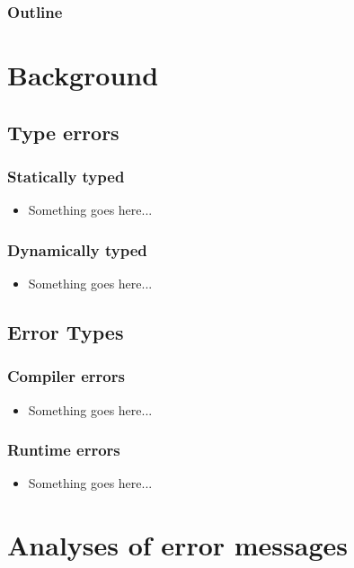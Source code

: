 \documentclass{beamer}
\begin{document}
\begin{frame}
  \frametitle{Outline}
  \tableofcontents[hideallsubsections]
\end{frame}

\section[Background]{Background}

\subsection{Type errors}

\begin{frame}
  \frametitle{Statically typed}
	\begin{itemize}
		\item Something goes here...
	\end{itemize}
\end{frame}

\begin{frame}
  \frametitle{Dynamically typed}
	\begin{itemize}
		\item Something goes here...
	\end{itemize}
\end{frame}

\subsection{Error Types}

\begin{frame}
	\frametitle{Compiler errors}
		\begin{itemize}
			\item Something goes here...
		\end{itemize}
\end{frame}

\begin{frame}
	\frametitle{Runtime errors}
		\begin{itemize}
			\item Something goes here...
		\end{itemize}

\end{frame}

\section[Analyses]{Analyses of error messages}
\end{document}
